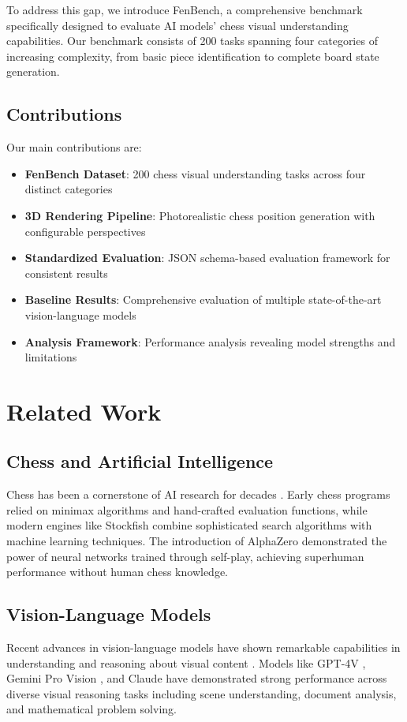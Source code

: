 \documentclass{article}
\begin{document}
To address this gap, we introduce FenBench, a comprehensive benchmark specifically designed to evaluate AI models' chess visual understanding capabilities. Our benchmark consists of 200 tasks spanning four categories of increasing complexity, from basic piece identification to complete board state generation.

\vspace{1cm}

\subsection{Contributions}

Our main contributions are:
\begin{itemize}
    \item \textbf{FenBench Dataset}: 200 chess visual understanding tasks across four distinct categories
    \item \textbf{3D Rendering Pipeline}: Photorealistic chess position generation with configurable perspectives
    \item \textbf{Standardized Evaluation}: JSON schema-based evaluation framework for consistent results
    \item \textbf{Baseline Results}: Comprehensive evaluation of multiple state-of-the-art vision-language models
    \item \textbf{Analysis Framework}: Performance analysis revealing model strengths and limitations
\end{itemize}

\section{Related Work}

\subsection{Chess and Artificial Intelligence}
Chess has been a cornerstone of AI research for decades \cite{shannon1950programming, campbell2002deep}. Early chess programs relied on minimax algorithms and hand-crafted evaluation functions, while modern engines like Stockfish combine sophisticated search algorithms with machine learning techniques. The introduction of AlphaZero \cite{silver2017mastering} demonstrated the power of neural networks trained through self-play, achieving superhuman performance without human chess knowledge.

\subsection{Vision-Language Models}
Recent advances in vision-language models have shown remarkable capabilities in understanding and reasoning about visual content \cite{radford2021learning, alayrac2022flamingo}. Models like GPT-4V \cite{openai2023gpt4v}, Gemini Pro Vision \cite{team2023gemini}, and Claude have demonstrated strong performance across diverse visual reasoning tasks including scene understanding, document analysis, and mathematical problem solving.
\end{document}
